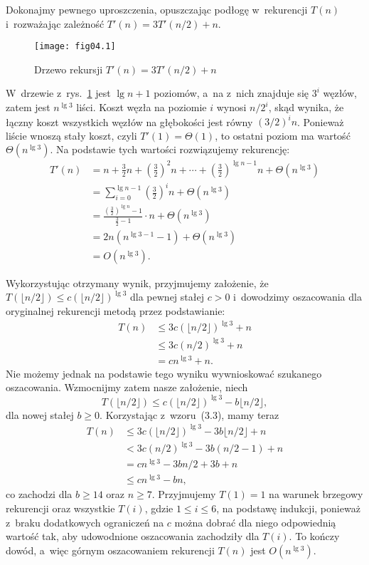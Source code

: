 
\exercise %
Dokonajmy pewnego uproszczenia, opuszczając podłogę w~rekurencji $T(n)$ i~rozważając zależność $T'(n)=3T'(n/2)+n$.
\begin{figure}[ht]
	\begin{center}
		\texttt{[image: fig04.1]}
	\end{center}
	\caption{Drzewo rekursji $T'(n)=3T'(n/2)+n$} \label{fig:4.2-1}
\end{figure}
W~drzewie z~rys.~\ref{fig:4.2-1} jest $\lg n+1$ poziomów, a~na  z~nich znajduje się $3^i$ węzłów, zatem jest $n^{\lg3}$ liści. Koszt węzła na poziomie $i$ wynosi $n/2^i$, skąd wynika, że łączny koszt wszystkich węzłów na  głębokości jest równy $(3/2)^in$. Ponieważ liście wnoszą stały koszt, czyli $T'(1)=\Theta(1)$, to ostatni poziom ma wartość $\Theta(n^{\lg3})$. Na podstawie tych wartości rozwiązujemy rekurencję:
\begin{align*}
	T'(n) &= n+\frac{3}{2}n+\left(\frac{3}{2}\right)^2n+\cdots+\left(\frac{3}{2}\right)^{\lg n-1}n+\Theta(n^{\lg 3}) \\
	&= \sum_{i=0}^{\lg n-1}\left(\frac{3}{2}\right)^in+\Theta(n^{\lg 3}) \\
	&= \frac{\left(\frac{3}{2}\right)^{\lg n}-1}{\frac{3}{2}-1}\cdot n+\Theta(n^{\lg 3}) \\[1mm]
	&= 2n(n^{\lg 3-1}-1)+\Theta(n^{\lg 3}) \\
	&= O(n^{\lg 3}).
\end{align*}

Wykorzystując otrzymany wynik, przyjmujemy założenie, że $T(\lfloor n/2\rfloor)\le c(\lfloor n/2\rfloor)^{\lg 3}$ dla pewnej stałej $c>0$ i~dowodzimy oszacowania dla oryginalnej rekurencji metodą przez podstawianie:
\begin{align*}
	T(n) &\le 3c(\lfloor n/2\rfloor)^{\lg 3}+n \\
	&\le 3c(n/2)^{\lg 3}+n \\
	&= cn^{\lg 3}+n.
\end{align*}
Nie możemy jednak na podstawie tego wyniku wywnioskować szukanego oszacowania. Wzmocnijmy zatem nasze założenie, niech
\[
	T(\lfloor n/2\rfloor) \le c(\lfloor n/2\rfloor)^{\lg 3}-b\lfloor n/2\rfloor,
\]
dla nowej stałej $b\ge0$. Korzystając z~wzoru~(3.3), mamy teraz
\begin{align*}
	T(n) &\le 3c(\lfloor n/2\rfloor)^{\lg 3}-3b\lfloor n/2\rfloor+n \\
	&< 3c(n/2)^{\lg 3}-3b(n/2-1)+n \\
	&= cn^{\lg 3}-3bn/2+3b+n \\
	&\le cn^{\lg 3}-bn,
\end{align*}
co zachodzi dla $b\ge14$ oraz $n\ge7$. Przyjmujemy $T(1)=1$ na warunek brzegowy rekurencji oraz wszystkie $T(i)$, gdzie $1\le i\le6$, na podstawę indukcji, ponieważ z~braku dodatkowych ograniczeń na $c$ można dobrać dla niego odpowiednią wartość tak, aby udowodnione oszacowania zachodziły dla $T(i)$. To kończy dowód, a~więc górnym oszacowaniem rekurencji $T(n)$ jest $O(n^{\lg3})$.

